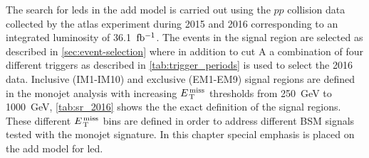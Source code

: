 The search for \glspl{led} in the \gls{add} model is carried out using the $pp$
collision data collected by the \gls{atlas} experiment during 2015 and 2016
corresponding to an integrated luminosity of 36.1~$\mbox{fb$^{-1}$}$. The events in the
signal region are selected as described in \cref{sec:event-selection} where in
addition to cut A a combination of four different triggers as described in
\cref{tab:trigger_periods} is used to select the 2016 data. Inclusive (IM1-IM10)
and exclusive (EM1-EM9) signal regions are defined in the monojet analysis with
increasing $E_\mathrm{\, T}^\mathrm{\, miss}$ thresholds from 250~GeV to 1000~GeV, \cref{tab:sr_2016} shows
the the exact definition of the signal regions. These different $E_\mathrm{\, T}^\mathrm{\, miss}$ bins are
defined in order to address different BSM signals tested with the monojet
signature. In this chapter special emphasis is placed on the \gls{add} model for
\gls{led}.
\begin{table}[!th]
  \centering
  \caption{Definition of the signal region.}
  \label{tab:sr_2016}
\end{table}
